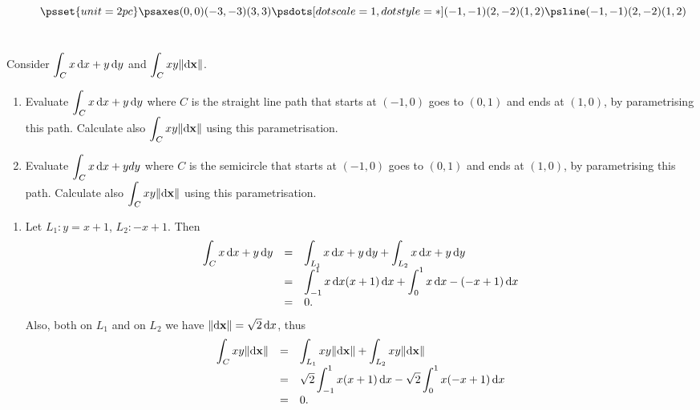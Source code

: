 \vspace*{2cm}
\begin{figure}[htpb]

$$ \psset{unit=2pc}\renewcommand{\pshlabel}[1]{{\tiny
#1}}
\renewcommand{\psvlabel}[1]{{\tiny #1}} \psaxes(0,0)(-3,-3)(3,3)
\psdots[dotscale=1, dotstyle=*](-1,-1)(2,-2)(1,2)
\psline(-1,-1)(2,-2)(1,2)
$$ \vspace*{2cm} \label{fig:int_along_a_length}
\end{figure}

\section*{}
\begin{multicols}{2}\columnseprule 1pt \columnsep 25pt
\begin{problem}
Consider $\dint _C x\d{x}+y\d{y}$ and $\dint _C xy
\norm{\d{\point{x}}} $.
\begin{enumerate}
\item  Evaluate $\dint _C x\d{x}+y\d{y}$ where $C$ is the straight line path that starts at $(-1,0)$ goes to $(0,1)$ and ends at $(1,0)$, by parametrising this
path. Calculate also $\dint _C xy \norm{\d{\point{x}}} $ using this
parametrisation.
\item  Evaluate $\dint _C x\d{x}+yd{y}$ where $C$ is the semicircle that starts at $(-1,0)$ goes to $(0,1)$ and ends at $(1,0)$, by parametrising this
path. Calculate also $\dint _C xy \norm{\d{\point{x}}} $ using this
parametrisation.
\end{enumerate}
\begin{answer}
\noindent
\begin{enumerate}
\item  Let $L_1: y =x+1$, $L_2: -x+1$. Then
$$
\begin{array}{lll}
\dint _C x\d{x}+y\d{y} & = & \dint _{L_1} x\d{x}+y\d{y}+\dint _{L_2}
x\d{x}+y\d{y}\\
& = & \dint _{-1} ^1 x\d{x} (x+1)\d{x} + \dint _0 ^1 x\d{x}
-(-x+1)\d{x}\\
& = & 0.
\end{array}
$$
Also, both on $L_1$ and on $L_2$ we have
$\norm{\d{\point{x}}}=\sqrt{2}\d{x}$, thus
$$
\begin{array}{lll}
\dint _C xy \norm{\d{\point{x}}}& = & \dint _{L_1}xy
\norm{\d{\point{x}}}+\dint _{L_2}
xy \norm{\d{\point{x}}}\\
& = & \sqrt{2}\dint _{-1} ^1 x(x+1)\d{x} - \sqrt{2}\dint _0 ^1 x(-x+1)\d{x}\\
& = & 0.
\end{array}
$$


\end{enumerate}
\end{answer}
\end{problem}
\end{multicols}
